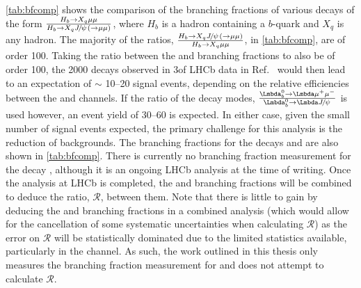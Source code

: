 \autoref{tab:bfcomp} shows the comparison of the branching fractions of various decays of the form $\frac{H_{b}\rightarrow X_{q}\mu\mu}{H_{b} \rightarrow X_{q} {{J\mkern -3mu/\mkern -2mu\psi\mkern 2mu}} (\rightarrow\mu\mu)}$, where $H_b$ is a hadron containing a $b$-quark and $X_{q}$ is any hadron. The majority of the ratios, $\frac{H_{b} \rightarrow X_{q} {{J\mkern -3mu/\mkern -2mu\psi\mkern 2mu}} (\rightarrow\mu\mu)}{H_{b}\rightarrow X_{q}\mu\mu}$, in \autoref{tab:bfcomp}, are of order 100. Taking the ratio between the \Lbpijpsi and \Lbpi branching fractions  to also be of order 100, the 2000 \Lbpijpsi decays observed in 3\invfb of LHCb data in Ref.~\cite{LHCb-PAPER-2014-020} would then lead to an expectation of $\sim$ 10--20 \Lbpi signal events, depending on the relative efficiencies between the \Lbpi and \Lbpijpsi channels. If the ratio of the \Lb decay modes, $\frac{\Lb\to\PLambda\mup\mun}{\Lb\to\PLambda\jpsi}$  is used however, an event yield of 30--60 is expected. In either case, given the small number of signal events expected, the primary challenge for this analysis is the reduction of backgrounds. The branching fractions for the decays \Lbpijpsi and \LbKjpsi are also shown in \autoref{tab:bfcomp}. There is currently no branching fraction measurement for the decay \LbK, although it is an ongoing LHCb analysis at the time of writing. Once the \LbK analysis at LHCb is completed, the \LbK and \Lbpi branching fractions will be combined to deduce the ratio, $\mathcal{R}$, between them. Note that there is little to gain by deducing the \LbK and \Lbpi branching fractions in a combined analysis (which would allow for the cancellation of some systematic uncertainties when calculating $\mathcal{R}$) as the error on $\mathcal{R}$ will be statistically dominated due to the limited statistics available, particularly in the \Lbpi channel. As such, the work outlined in this thesis only measures the branching fraction measurement for \Lbpi and does not attempt to calculate $\mathcal{R}$.  %


